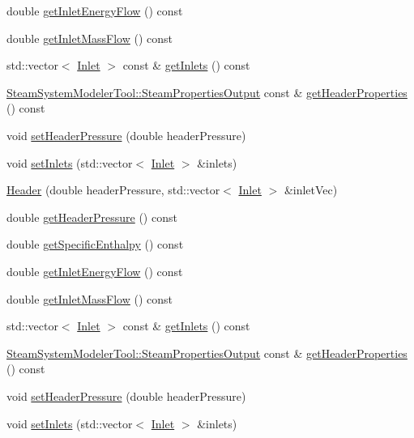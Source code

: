 \begin{DoxyCompactItemize}
\item 
double \hyperlink{class_header_a2a30ee96fa76bab1533cb9ceea0c8af3}{get\+Inlet\+Energy\+Flow} () const
\item 
double \hyperlink{class_header_ad572e6144481b9e9f65004aacebd701c}{get\+Inlet\+Mass\+Flow} () const
\item 
std\+::vector$<$ \hyperlink{class_inlet}{Inlet} $>$ const  \& \hyperlink{class_header_a625d7317488c88c949acd05c72a7c54a}{get\+Inlets} () const
\item 
\hyperlink{struct_steam_system_modeler_tool_1_1_steam_properties_output}{Steam\+System\+Modeler\+Tool\+::\+Steam\+Properties\+Output} const  \& \hyperlink{class_header_a0d27b0e1b3c16cc24b4ba6f64abb7cb0}{get\+Header\+Properties} () const
\item 
void \hyperlink{class_header_a3af0b7964b74287ce0c662b9a88556ed}{set\+Header\+Pressure} (double header\+Pressure)
\item 
void \hyperlink{class_header_ae69b6f894210a6cd340e92222f8bc343}{set\+Inlets} (std\+::vector$<$ \hyperlink{class_inlet}{Inlet} $>$ \&inlets)
\item 
\hyperlink{class_header_a59b836abde0be58bec65ebea1ac67a3b}{Header} (double header\+Pressure, std\+::vector$<$ \hyperlink{class_inlet}{Inlet} $>$ \&inlet\+Vec)
\item 
double \hyperlink{class_header_adc2e6daaf9f5e633c3db96ff3990f1f6}{get\+Header\+Pressure} () const
\item 
double \hyperlink{class_header_af913dbf132f8cb3af6e6b374813acd93}{get\+Specific\+Enthalpy} () const
\item 
double \hyperlink{class_header_a2a30ee96fa76bab1533cb9ceea0c8af3}{get\+Inlet\+Energy\+Flow} () const
\item 
double \hyperlink{class_header_ad572e6144481b9e9f65004aacebd701c}{get\+Inlet\+Mass\+Flow} () const
\item 
std\+::vector$<$ \hyperlink{class_inlet}{Inlet} $>$ const  \& \hyperlink{class_header_a625d7317488c88c949acd05c72a7c54a}{get\+Inlets} () const
\item 
\hyperlink{struct_steam_system_modeler_tool_1_1_steam_properties_output}{Steam\+System\+Modeler\+Tool\+::\+Steam\+Properties\+Output} const  \& \hyperlink{class_header_a0d27b0e1b3c16cc24b4ba6f64abb7cb0}{get\+Header\+Properties} () const
\item 
void \hyperlink{class_header_a3af0b7964b74287ce0c662b9a88556ed}{set\+Header\+Pressure} (double header\+Pressure)
\item 
void \hyperlink{class_header_ae69b6f894210a6cd340e92222f8bc343}{set\+Inlets} (std\+::vector$<$ \hyperlink{class_inlet}{Inlet} $>$ \&inlets)
\end{DoxyCompactItemize}
